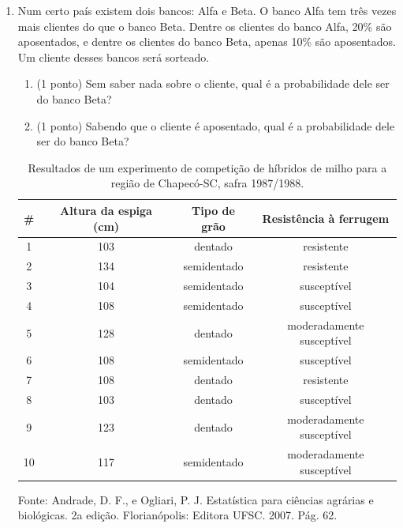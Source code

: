 \documentclass{article}
\begin{document}
\begin{enumerate}

\item Num certo país existem dois bancos: Alfa e Beta. O banco Alfa tem três vezes mais clientes do que o banco Beta. Dentre os clientes do banco Alfa, 20\% são aposentados, e dentre os clientes do banco Beta, apenas 10\% são aposentados. Um cliente desses bancos será sorteado.
\begin{enumerate}
	\item (1 ponto) Sem saber nada sobre o cliente, qual é a probabilidade dele ser do banco Beta?
	
	\item (1 ponto) Sabendo que o cliente é aposentado, qual é a probabilidade dele ser do banco Beta?

\end{enumerate}


	\begin{table}[thp]
	\caption{Resultados de um experimento de competição de híbridos de milho para a região de Chapecó-SC, safra 1987/1988.}
	\centering
	\begin{tabular}{cccc}
		\hline
		\# & Altura da espiga (cm) & Tipo de grão & Resistência à ferrugem \\
		\hline
		1 & 103 & dentado & resistente \\
		2 & 134 & semidentado & resistente \\
		3 & 104 & semidentado & susceptível \\
		4 & 108 & semidentado & susceptível \\
		5 & 128 & dentado & moderadamente susceptível \\
		6 & 108 & semidentado & susceptível \\
		7 & 108 & dentado & resistente \\
		8 & 103 & dentado & susceptível \\
		9 & 123 & dentado & moderadamente susceptível \\
		10 & 117 & semidentado & moderadamente susceptível \\
		\hline
	\end{tabular}
	\label{t:milho}
\end{table}	
\vspace{-1em}
{\footnotesize Fonte: Andrade, D. F., e Ogliari, P. J. Estatística para ciências agrárias e biológicas. 2a edição. Florianópolis: Editora UFSC. 2007. Pág. 62.}\\


\end{enumerate}
\end{document}
